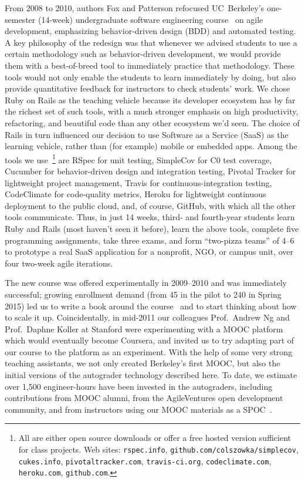 From 2008 to 2010, authors Fox and Patterson refocused
UC~Berkeley's one-semester (14-week) undergraduate software engineering
course~\cite{crossing_the_software_chasm,agile_sw_curriculum} on agile
development, emphasizing
behavior-driven design (BDD)
and automated testing.  A key
 philosophy of the redesign
was that whenever we advised students to use a certain
methodology such as behavior-driven
development, we would provide them with a best-of-breed tool to immediately
practice that methodology.  These tools would not only enable the
students to learn immediately by doing, but also provide quantitative
feedback for instructors to check students' work.  
We chose Ruby on Rails as the teaching vehicle because its developer
ecosystem has by far the richest set of such tools, with a much stronger
emphasis on high productivity, refactoring, and beautiful code than any
other ecosystem we'd seen.
The choice of Rails in turn influenced our decision to use Software as a
Service (SaaS) as the learning vehicle, rather than (for example) mobile
or embedded apps.
Among the tools we
use~\footnote{All are either open source downloads or offer a free
hosted version sufficient for class projects.  Web
sites: \texttt{rspec.info}, \texttt{github.com/colszowka/simplecov},
\texttt{cukes.info}, \texttt{pivotaltracker.com},
\texttt{travis-ci.org}, \texttt{codeclimate.com}, \texttt{heroku.com}, \texttt{github.com}.} 
are 
RSpec for unit testing,
SimpleCov for C0 test coverage,
Cucumber for behavior-driven design and integration testing,
Pivotal Tracker for lightweight project management,
Travis for continuous-integration testing,
CodeClimate for code-quality metrics,
Heroku for lightweight continuous deployment to the public cloud,
and, of course, GitHub, with which all the
other tools communicate.  
Thus, in just 14 weeks, third- and fourth-year students learn Ruby
and Rails (most haven't seen it before), learn the above tools, complete
five programming assignments, take three exams, and form ``two-pizza
teams'' of 4--6 to prototype a real SaaS application for a nonprofit,
NGO, or campus unit, over four two-week agile iterations.

The new course was offered experimentally in 2009--2010 and was
immediately successful; growing enrollment demand (from 45 in the pilot
to 240 in Spring 2015) led 
us to write a book around the course~\cite{esaaS} and to start thinking
about how to scale it up.  
Coincidentally, in mid-2011 our colleagues Prof.~Andrew Ng
and Prof.~Daphne Koller at Stanford were experimenting with a MOOC
platform which would eventually become Coursera, and invited us to try
adapting part of our course to the
platform as an experiment.  With the help of some very strong teaching
assistants, we not only created Berkeley's first MOOC, but also the
initial versions of the autograder technology described here.  To date,
we estimate over 1,500 engineer-hours have been invested in the
autograders, including contributions from MOOC alumni,
from the AgileVentures  open development community,
and from
instructors using our MOOC materials as a SPOC~\cite{moocs-spocs-TR}.

